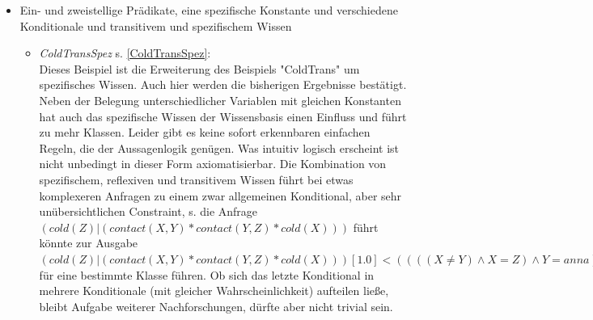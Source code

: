 \documentclass[a4paper, 11pt]{book}
\begin{document}
\begin{itemize}
\begin{itemize}
 Man betrachte das qualitative Konditional $\langle (cold(X) \mid ((contact(X,Y)  \land \\ contact(Y,Z)) \land cold(Z)),  X = Z \rangle$ . Sei cold(Z) (als Teil der Prämisse) wahr. Dann ist $ cold(X) $ (also die Konklusion) auch wahr für X = Z, was nicht weiter überraschend ist, aber an dieser Stelle für erwähnenswert gehalten wurde, da es durchaus für den Entwurf eines regelbasierten Algorithmus relevant sein könnte. Das qualitative Konditional sollte damit wie folgt aussehen: $\langle (cold(X) \mid ((contact(X,Y)  \land contact(Y,Z)) \land cold(Z)) [1.00000],  X = Z \rangle$.\\ Im Ergebnis bleibt zu sagen, dass auch Transitivität zu keinen überraschenden Ergebnissen führt. Lediglich die Belegung unterschiedlicher Variablen mit gleichen Konstanten hat einen erheblichen Einfluss. Ebenso die Gestalt bzw. das Wissen der Anfrage.
\end{itemize}


\item{Ein- und zweistellige Prädikate, eine spezifische Konstante und verschiedene Konditionale und transitivem und spezifischem Wissen}
\begin{itemize}
\item \textsl{ColdTransSpez} \label{BColdTransSpez} s. \ref{ColdTransSpez}:\\
Dieses Beispiel ist die Erweiterung des Beispiels "{}ColdTrans"{} um spezifisches Wissen. Auch hier werden die bisherigen Ergebnisse bestätigt. Neben der Belegung unterschiedlicher Variablen mit gleichen Konstanten hat auch das spezifische Wissen der Wissensbasis einen Einfluss und führt zu mehr Klassen. Leider gibt es keine sofort erkennbaren einfachen Regeln, die der Aussagenlogik genügen. Was intuitiv logisch erscheint ist nicht unbedingt in dieser Form axiomatisierbar. Die Kombination von spezifischem, reflexiven und transitivem Wissen führt bei etwas komplexeren Anfragen zu einem zwar allgemeinen Konditional, aber sehr unübersichtlichen Constraint, s. die Anfrage $ (cold(Z)|(contact(X,Y) * contact(Y,Z) * cold(X))) $ führt könnte zur Ausgabe $ (cold(Z)|(contact(X,Y) * contact(Y,Z) * cold(X)))[1.0]<((((X \neq Y) \land X = Z) \land Y = anna) \lor ( X = Y \land X = Z)) \lor (X = Z \land Z = anna) \land X \neq Y)) \lor (( X \neq anna \land Y \neq anna \land Z \neq anna))> $ für eine bestimmte Klasse führen. Ob sich das letzte Konditional in mehrere Konditionale (mit gleicher Wahrscheinlichkeit) aufteilen ließe, bleibt Aufgabe weiterer Nachforschungen, dürfte aber nicht trivial sein. 
\end{itemize}

\end{itemize}
\end{document}
